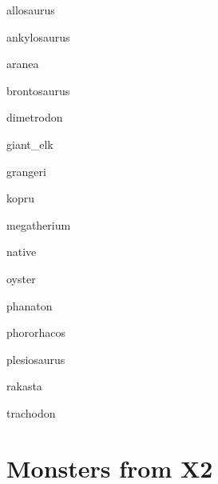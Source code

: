 \documentclass[letterpaper,serif]{module}
\begin{document}
\begin{newmonster}{allosaurus}\end{newmonster}
\begin{newmonster}{ankylosaurus}\end{newmonster}
\begin{newmonster}{aranea}\end{newmonster}
\begin{newmonster}{brontosaurus}\end{newmonster}
\begin{newmonster}{dimetrodon}\end{newmonster}
\begin{newmonster}{giant_elk}\end{newmonster}
\begin{newmonster}{grangeri}\end{newmonster}
\begin{newmonster}{kopru}\end{newmonster}
\begin{newmonster}{megatherium}\end{newmonster}
\begin{newmonster}{native}\end{newmonster}
\begin{newmonster}{oyster}\end{newmonster}
\begin{newmonster}{phanaton}\end{newmonster}
\begin{newmonster}{phororhacos}\end{newmonster}
\begin{newmonster}{plesiosaurus}\end{newmonster}
\begin{newmonster}{rakasta}\end{newmonster}
\begin{newmonster}{trachodon}\end{newmonster}

\part{Monsters from X2}
\end{document}
